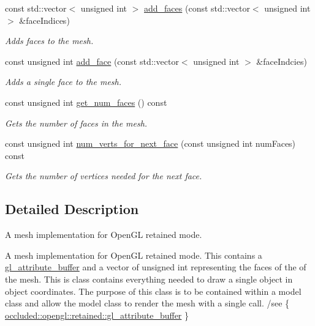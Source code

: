 \begin{DoxyCompactItemize}
const std\+::vector$<$ unsigned int $>$ \hyperlink{classoccluded_1_1opengl_1_1retained_1_1gl__retained__mesh_a3f0f0574b87516c2a88d1bf14089c801}{add\+\_\+faces} (const std\+::vector$<$ unsigned int $>$ \&face\+Indices)
\begin{DoxyCompactList}\small\item\em Adds faces to the mesh. \end{DoxyCompactList}\item 
const unsigned int \hyperlink{classoccluded_1_1opengl_1_1retained_1_1gl__retained__mesh_ae9f8c756698b09458d61aba3a616f78b}{add\+\_\+face} (const std\+::vector$<$ unsigned int $>$ \&face\+Indcies)
\begin{DoxyCompactList}\small\item\em Adds a single face to the mesh. \end{DoxyCompactList}\item 
const unsigned int \hyperlink{classoccluded_1_1opengl_1_1retained_1_1gl__retained__mesh_a57bfbb414bd06bab36f09c19bc0a4e13}{get\+\_\+num\+\_\+faces} () const 
\begin{DoxyCompactList}\small\item\em Gets the number of faces in the mesh. \end{DoxyCompactList}\item 
const unsigned int \hyperlink{classoccluded_1_1opengl_1_1retained_1_1gl__retained__mesh_ab3efafd282bb6f844bd21ca911cfe9dd}{num\+\_\+verts\+\_\+for\+\_\+next\+\_\+face} (const unsigned int num\+Faces) const 
\begin{DoxyCompactList}\small\item\em Gets the number of vertices needed for the next face. \end{DoxyCompactList}\end{DoxyCompactItemize}


\subsection{Detailed Description}
A mesh implementation for Open\+G\+L retained mode. 

A mesh implementation for Open\+G\+L retained mode. This contains a \hyperlink{classoccluded_1_1opengl_1_1retained_1_1gl__attribute__buffer}{gl\+\_\+attribute\+\_\+buffer} and a vector of unsigned int representing the faces of the of the mesh. This is class contains everything needed to draw a single object in object coordinates. The purpose of this class is to be contained within a model class and allow the model class to render the mesh with a single call. /see \{ \hyperlink{classoccluded_1_1opengl_1_1retained_1_1gl__attribute__buffer}{occluded\+::opengl\+::retained\+::gl\+\_\+attribute\+\_\+buffer} \} 

